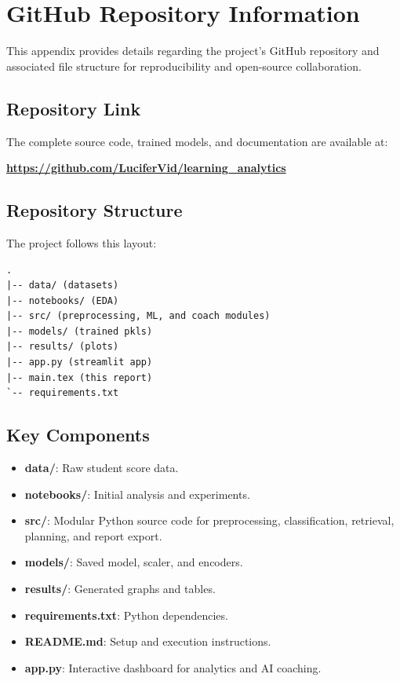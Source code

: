 \documentclass[conference]{IEEEtran}
\begin{document}



\appendix

\section{GitHub Repository Information}

This appendix provides details regarding the project’s GitHub repository and associated file structure for reproducibility and open-source collaboration.

\subsection{Repository Link}
The complete source code, trained models, and documentation are available at:

\begin{center}
\textbf{\url{https://github.com/LuciferVid/learning_analytics}}
\end{center}

\subsection{Repository Structure}

The project follows this layout:
\begin{lstlisting}
.
|-- data/ (datasets)
|-- notebooks/ (EDA)
|-- src/ (preprocessing, ML, and coach modules)
|-- models/ (trained pkls)
|-- results/ (plots)
|-- app.py (streamlit app)
|-- main.tex (this report)
`-- requirements.txt
\end{lstlisting}

\subsection{Key Components}

\begin{itemize}
    \item \textbf{data/}: Raw student score data.
    \item \textbf{notebooks/}: Initial analysis and experiments.
    \item \textbf{src/}: Modular Python source code for preprocessing, classification, retrieval, planning, and report export.
    \item \textbf{models/}: Saved model, scaler, and encoders.
    \item \textbf{results/}: Generated graphs and tables.
    \item \textbf{requirements.txt}: Python dependencies.
    \item \textbf{README.md}: Setup and execution instructions.
    \item \textbf{app.py}: Interactive dashboard for analytics and AI coaching.
\end{itemize}
\end{document}
